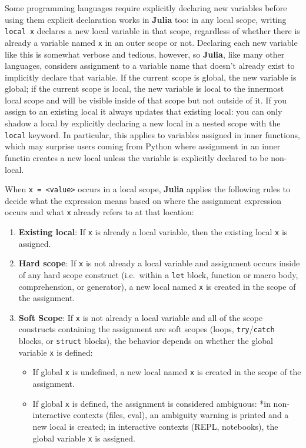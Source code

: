 \documentclass[
]{article}
\providecommand{\tightlist}{%
  \setlength{\itemsep}{0pt}\setlength{\parskip}{0pt}}
\begin{document}
Some programming languages require explicitly declaring new variables
before using them explicit declaration works in \textbf{Julia} too: in
any local scope, writing \texttt{local\ x} declares a new local variable
in that scope, regardless of whether there is already a variable named
\texttt{x} in an outer scope or not. Declaring each new variable like
this is somewhat verbose and tedious, however, so \textbf{Julia}, like
many other languages, considers assignment to a variable name that
doesn't already exist to implicitly declare that variable. If the
current scope is global, the new variable is global; if the current
scope is local, the new variable is local to the innermost local scope
and will be visible inside of that scope but not outside of it. If you
assign to an existing local it always updates that existing local: you
can only shadow a local by explicitly declaring a new local in a nested
scope with the \texttt{local} keyword. In particular, this applies to
variables assigned in inner functions, which may surprise users coming
from Python where assignment in an inner functin creates a new local
unless the variable is explicitly declared to be non-local.

When \texttt{x\ =\ \textless{}value\textgreater{}} occurs in a local
scope, \textbf{Julia} applies the following rules to decide what the
expression means based on where the assignment expression occurs and
what \texttt{x} already refers to at that location:

\begin{enumerate}
\def\labelenumi{\arabic{enumi}.}
\tightlist
\item
  \textbf{Existing local}: If \texttt{x} is already a local variable,
  then the existing local \texttt{x} is assigned.
\item
  \textbf{Hard scope}: If \texttt{x} is not already a local variable and
  assignment occurs inside of any hard scope construct (i.e.~within a
  \texttt{let} block, function or macro body, comprehension, or
  generator), a new local named \texttt{x} is created in the scope of
  the assignment.
\item
  \textbf{Soft Scope}: If \texttt{x} is not already a local variable and
  all of the scope constructs containing the assignment are soft scopes
  (loops, \texttt{try}/\texttt{catch} blocks, or \texttt{struct}
  blocks), the behavior depends on whether the global variable
  \texttt{x} is defined:

  \begin{itemize}
  \tightlist
  \item
    If global \texttt{x} is undefined, a new local named \texttt{x} is
    created in the scope of the assignment.
  \item
    If global \texttt{x} is defined, the assignment is considered
    ambiguous: *in non-interactive contexts (files, eval), an ambiguity
    warning is printed and a new local is created; in interactive
    contexts (REPL, notebooks), the global variable \texttt{x} is
    assigned.
  \end{itemize}
\end{enumerate}
\end{document}
